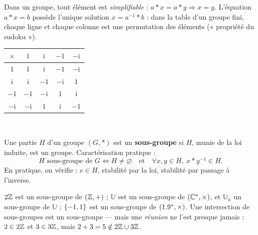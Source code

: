 \noindent
\begin{minipage}[c]{0.56\linewidth}
\begin{propriete}
Dans un groupe, tout élément est \emph{simplifiable} :
$a*x=a*y\Rightarrow x=y$. L'équation $a*x=b$ possède l'unique solution
$x=a^{-1}*b$ : dans la table d'un groupe fini, chaque ligne et chaque
colonne est une permutation des éléments (« propriété du sudoku »).
\end{propriete}
\end{minipage}\hfill
\begin{minipage}[c]{0.4\linewidth}
\centering
{\renewcommand{\arraystretch}{1.3}%
\begin{tabular}{@{}c|cccc@{}}
$\times$ & $1$ & $\mathrm{i}$ & $-1$ & $-\mathrm{i}$\\
\hline
$1$ & $1$ & $\mathrm{i}$ & $-1$ & $-\mathrm{i}$\\
$\mathrm{i}$ & $\mathrm{i}$ & $-1$ & $-\mathrm{i}$ & $1$\\
$-1$ & $-1$ & $-\mathrm{i}$ & $1$ & $\mathrm{i}$\\
$-\mathrm{i}$ & $-\mathrm{i}$ & $1$ & $\mathrm{i}$ & $-1$\\
\end{tabular}}\\[1mm]
\end{minipage}


\begin{definition}
Une partie $H$ d'un groupe $(G,*)$ est un \textbf{sous-groupe} si $H$,
munie de la loi induite, est un groupe. Caractérisation pratique :
\[
  H\text{ sous-groupe de }G
  \iff
  H\neq\varnothing
  \quad\text{et}\quad
  \forall x,y\in H,\ x*y^{-1}\in H.
\]
En pratique, on vérifie : $e\in H$, stabilité par la loi, stabilité par
passage à l'inverse.
\end{definition}

\begin{exemple}
$2\mathbb{Z}$ est un sous-groupe de $(\mathbb{Z},+)$ ; $\mathbb{U}$ est un sous-groupe de
$(\mathbb{C}^{*},\times)$, et $\mathbb{U}_n$ un sous-groupe de $\mathbb{U}$ ;
$\left\{-1,1\right\}$ est un sous-groupe de $(1.9^{*},\times)$. Une intersection de
sous-groupes est un sous-groupe — mais une \emph{réunion} ne l'est presque
jamais : $2\in2\mathbb{Z}$ et $3\in3\mathbb{Z}$, mais $2+3=5\notin2\mathbb{Z}\cup3\mathbb{Z}$.
\end{exemple}

